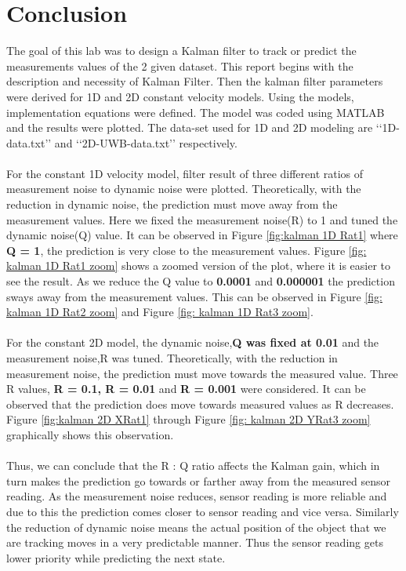 \documentclass[12pt]{article}
\begin{document}
\section{Conclusion}
The goal of this lab was to design a Kalman filter to track or predict the measurements values of the 2 given dataset. This report begins with the description and necessity of Kalman Filter. Then the kalman filter parameters were derived for 1D and 2D constant velocity models. Using the models, implementation equations were defined. The model was coded using MATLAB and the results were plotted. The data-set used for 1D and 2D modeling are \lq\lq{}1D-data.txt\rq\rq{} and \lq\lq{}2D-UWB-data.txt\rq\rq{} respectively. \\
\\
For the constant 1D velocity model, filter result of three different ratios of measurement noise to dynamic noise were plotted. Theoretically, with the reduction in dynamic noise, the prediction must move away from the measurement values. Here we fixed the measurement noise(R) to 1 and tuned the dynamic noise(Q) value. It can be observed in Figure \ref{fig:kalman 1D Rat1} where \textbf{Q = 1}, the prediction is very close to the measurement values. Figure \ref{fig: kalman 1D Rat1 zoom} shows a zoomed version of the plot, where it is easier to see the result. As we reduce the Q value to \textbf{0.0001} and \textbf{0.000001} the prediction sways away from the measurement values. This can be observed in Figure \ref{fig: kalman 1D Rat2 zoom} and Figure \ref{fig: kalman 1D Rat3 zoom}.\\
\\
For the constant 2D model, the dynamic noise,\textbf{Q was fixed at 0.01} and the measurement noise,R was tuned. Theoretically, with the reduction in measurement noise, the prediction must move towards the measured value. Three R values, \textbf{R = 0.1, R = 0.01 } and \textbf{R = 0.001} were considered. It can be observed that the prediction does move towards measured values as R decreases. Figure \ref{fig:kalman 2D XRat1} through Figure \ref{fig: kalman 2D YRat3 zoom} graphically shows this observation. \\
\\
Thus, we can conclude that the R : Q ratio affects the Kalman gain, which in turn makes the prediction go towards or farther away from the measured sensor reading. As the measurement noise reduces, sensor reading is more reliable and due to this the prediction comes closer to sensor reading and vice versa. Similarly the reduction of dynamic noise means the actual position of the object that we are tracking moves in a very predictable manner. Thus the sensor reading gets lower priority while predicting the next state. 
\end{document}
